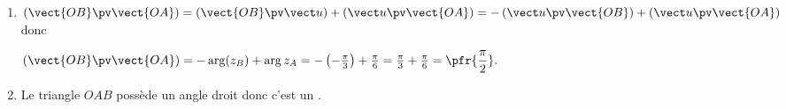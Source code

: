 \documentclass[10pt,french]{book}
\begin{document}
{\begin{enumerate}
\begin{enumerate}
On trouve alors : $\cos \theta =\frac{\sqrt 3}{2}$ et $\sin \theta = \frac 1 2$ ce qui correspond à .

\[\pfr{z_A = \intervalleff{2}{\frac{\pi}{6}}}\]

$z_B= \sqrt 3 - 3\I$

\[\begin{array}{rcl}
\abs{z_B }& = & \sqrt{(\sqrt 3)^2 + (-3)^2}\\
            & = & \sqrt{3 + 9} \\
            & = & \sqrt{12} \\
            & = & \sqrt{4 \times 3} \\
    \multicolumn{3}{l}{\pfr{\abs{z_B} = 2\sqrt3}}
\end{array} \qq
\begin{array}{rcl}
z_B& = & \sqrt 3 - 3\I \\[8pt]
            & = & 2\sqrt 3\left(\frac{\sqrt 3}{2\sqrt3} + \I\frac{-3}{2\sqrt3}\right) \\[8pt]
            & = & 2\sqrt3\left(\frac{1}{2} + \I\frac{-\sqrt 3}{2}\right) \\[8pt]
\end{array}\]

On trouve alors : $\cos \theta =\frac{1}{2}$ et $\sin \theta = -\frac{\sqrt3}{2}$ ce qui correspond à .

\[\pfr{z_B = \intervalleff{2\sqrt3}{\frac{-\pi}{3}}}\]

\item $\left(\vect{OB} \pv \vect{OA}\right) = \left(\vect{OB} \pv \vect u\right) + \left(\vect u \pv \vect{OA}\right) = -\left(\vect u \pv \vect{OB}\right)+ \left(\vect u \pv \vect{OA}\right)$ donc\par
$\left(\vect{OB} \pv \vect{OA}\right) =  -\arg(z_B) + \arg z_A = -\left(-\frac \pi 3\right) + \frac\pi 6 =\frac \pi 3 + \frac\pi 6 = \pfr{\dfrac \pi 2}.$
\item Le triangle $OAB$ possède un angle droit donc c'est un .
    \end{enumerate}
\end{enumerate}
}

 
\end{document}
